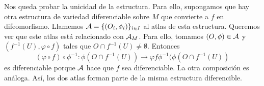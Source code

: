 \documentclass[twoside]{article}
\begin{document}
\begin{solucion}
Nos queda probar la unicidad de la estructura. Para ello, supongamos que hay otra estructura de variedad diferenciable sobre $M$ que convierte a $f$ en difeomorfismo. Llamemos $\mathcal{A}=\{(O_i,\phi_i)\}_{i\in I}$ al atlas de esta estructura. Queremos ver que este atlas está relacionado con $\mathcal{A}_M$. Para ello, tomamos $(O,\phi)\in\mathcal{A}$ y $(f^{-1}(U),\varphi\circ f)$ tales que $O\cap f^{-1}(U)\neq\emptyset$. Entonces
$$(\varphi\circ f)\circ\phi^{-1}:\phi(O\cap f^{-1}(U))\to\varphi f\phi^{-1}(\phi(O\cap f^{-1}(U))$$
es diferenciable porque $\mathcal{A}$ hace que $f$ sea diferenciable. La otra composición es análoga. Así, los dos atlas forman parte de la misma estructura diferencible.

\end{solucion}
\end{document}
